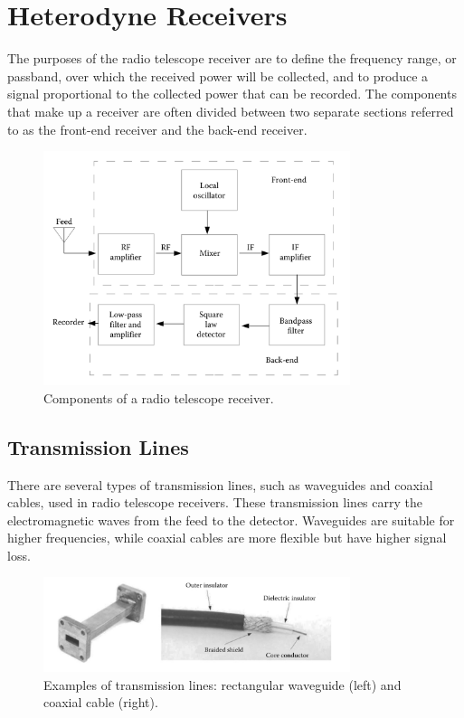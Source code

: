 \section{Heterodyne Receivers}

The purposes of the radio telescope receiver are to define the frequency range, or passband, over which the received power will be collected, and to produce a signal proportional to the collected power that can be recorded. The components that make up a receiver are often divided between two separate sections referred to as the front-end receiver and the back-end receiver.

\begin{figure}[H]
    \centering
    \includegraphics[width=0.8\textwidth]{Images/telescope_components.png}
    \caption{Components of a radio telescope receiver.}
    \label{fig:telescope_components}
\end{figure}

\subsection{Transmission Lines}

There are several types of transmission lines, such as waveguides and coaxial cables, used in radio telescope receivers. These transmission lines carry the electromagnetic waves from the feed to the detector. Waveguides are suitable for higher frequencies, while coaxial cables are more flexible but have higher signal loss.

\begin{figure}[H]
    \centering
    \includegraphics[width=0.8\textwidth]{Images/waveguide_coaxial.png}
    \caption{Examples of transmission lines: rectangular waveguide (left) and coaxial cable (right).}
    \label{fig:transmission_lines}
\end{figure}


